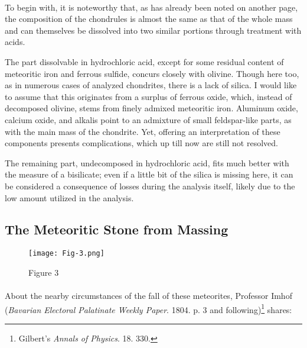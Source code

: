 \documentclass[a4paper, 12pt, oneside]{article}
\begin{document}
\paragraph{}
To begin with, it is noteworthy that, as has already been noted on another page, the composition of the chondrules is almost the same as that of the whole mass and can themselves be dissolved into two similar portions through treatment with acids. 

The part dissolvable in hydrochloric acid, except for some residual content of meteoritic iron and ferrous sulfide, concurs closely with olivine. Though here too, as in numerous cases of analyzed chondrites, there is a lack of silica. I would like to assume that this originates from a surplus of ferrous oxide, which, instead of decomposed olivine, stems from finely admixed meteoritic iron. Aluminum oxide, calcium oxide, and alkalis point to an admixture of small feldspar-like parts, as with the main mass of the chondrite. Yet, offering an interpretation of these components presents complications, which up till now are still not resolved.

The remaining part, undecomposed in hydrochloric acid, fits much better with the measure of a bisilicate; even if a little bit of the silica is missing here, it can be considered a consequence of losses during the analysis itself, likely due to the low amount utilized in the analysis.
\clearpage
\subsection{The Meteoritic Stone from Massing}
\begin{figure}[h]
\centering
\texttt{[image: Fig-3.png]}
\caption{Figure 3}
\end{figure}
\paragraph{}
About the nearby circumstances of the fall of these meteorites, Professor Imhof (\emph{Bavarian Electoral Palatinate Weekly Paper}. 1804. p. 3 and following)\footnote{Gilbert's \emph{Annals of Physics}. 18. 330.} shares:
\end{document}
